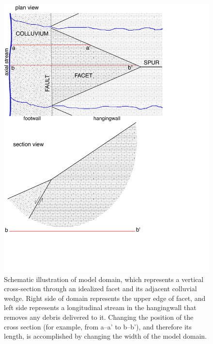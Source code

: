 \begin{figure}[ht!]
\centerline{\includegraphics[scale=0.6]{Figures/facet_plan_and_profile.pdf}}
\caption{Schematic illustration of model domain, which represents a vertical cross-section through an idealized facet and its adjacent colluvial wedge. Right side of domain represents the upper edge of facet, and left side represents a longitudinal stream in the hangingwall that removes any debris delivered to it. Changing the position of the cross section (for example, from a--a' to b--b'), and therefore its length, is accomplished by changing the width of the model domain.}
\label{fig:domainschematic}
\end{figure}

